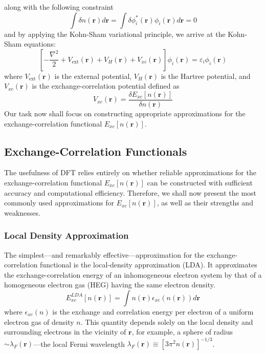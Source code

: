 along with the following constraint 
\begin{equation}
  \int \delta n(\mathbf{r}) d\mathbf{r} = \int \delta \phi_i^*(\mathbf{r}) \phi_i(\mathbf{r}) d\mathbf{r} = 0
  \label{eq55}
\end{equation}
and by applying the Kohn-Sham variational principle, we arrive at the Kohn-Sham equations: 
\begin{equation}
  \label{eq56}
  \left[-\frac{\nabla^2}{2} + V_{\text{ext}}(\mathbf{r}) + V_H(\mathbf{r}) + V_{xc}(\mathbf{r})\right]\phi_i(\mathbf{r}) = \varepsilon_i \phi_i(\mathbf{r})
\end{equation}
where $V_{\text{ext}}(\mathbf{r})$ is the external potential, $V_H(\mathbf{r})$ is the Hartree potential, and $V_{xc}(\mathbf{r})$ is the exchange-correlation potential defined as 
\begin{equation}
  \label{eq57}
  V_{xc}(\mathbf{r}) = \frac{\delta E_{xc}[n(\mathbf{r})]}{\delta n(\mathbf{r})}
\end{equation}
Our task now shall focus on constructing appropriate approximations for the exchange-correlation functional $E_{xc}[n(\mathbf{r})]$. 

\subsection{Exchange-Correlation Functionals}
The usefulness of DFT relies entirely on whether reliable approximations for the exchange-correlation functional $E_{xc}[n(\mathbf{r})]$ can be constructed with sufficient accuracy and computational efficiency. Therefore, we shall now present the most commonly used approximations for $E_{xc}[n(\mathbf{r})]$, as well as their strengths and weaknesses.  
\subsubsection{Local Density Approximation}
The simplest---and remarkably effective---approximation for the exchange-correlation functional is the local-density approximation (LDA)\supercite{Kohn1999}. It approximates the exchange-correlation energy of an inhomogeneous electron system by that of a homogeneous electron gas (HEG) having the same electron density. 
\begin{equation}
  \label{eq58}
  E_{xc}^{LDA}[n(\mathbf{r})] = \int n(\mathbf{r}) \epsilon_{xc}(n(\mathbf{r})) d\mathbf{r}
\end{equation}
where $\epsilon_{xc}(n)$  is the exchange and correlation energy per electron of a uniform electron gas of density $n$\supercite{Hohenberg1964, Kohn1965}. This quantity depends solely on the local density and surrounding electrons in the vicinity of $\mathbf{r}$, for example, a sphere of radius $\sim\lambda_F(\mathbf{r})$---the local Fermi wavelength\supercite{feng2005introduction} $\lambda_F(\mathbf{r})\equiv[3\pi^2 n(\mathbf{r})]^{-1/3}$.

